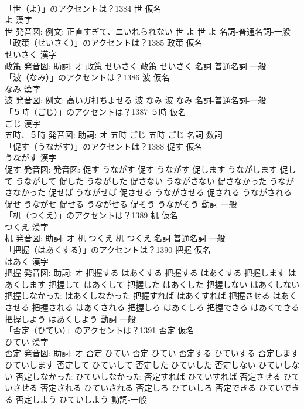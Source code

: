 \documentclass[8pt]{extreport}
\begin{document}
\begin{CJK}{UTF8}{min}
\\	「世（よ）」のアクセントは？1384	世 仮名　
\\	よ 漢字　
\\	世 発音図: 例文: 正直すぎて、ニいれられない	世 よ		世 よ				名詞-普通名詞-一般 
\\	「政策（せいさく）」のアクセントは？1385	政策 仮名　
\\	せいさく 漢字　
\\	政策 発音図: 助詞: オ	政策 せいさく		政策 せいさく				名詞-普通名詞-一般 
\\	「波（なみ）」のアクセントは？1386	波 仮名　
\\	なみ 漢字　
\\	波 発音図: 例文: 高いガ打ちよせる	波 なみ		波 なみ				名詞-普通名詞-一般 
\\	「５時（ごじ）」のアクセントは？1387	５時 仮名　
\\	ごじ 漢字　
\\	五時、５時 発音図: 助詞: オ	五時 ごじ		五時 ごじ				名詞-数詞 
\\	「促す（うながす）」のアクセントは？1388	促す 仮名　
\\	うながす 漢字　
\\	促す 発音図: 発音図:	促す うながす		促す うながす 促します うながします 促して うながして 促した うながした 促さない うながさない 促さなかった うながさなかった 促せば うながせば 促させる うながさせる 促される うながされる 促せ うながせ 促せる うながせる 促そう うながそう				動詞-一般 
\\	「机（つくえ）」のアクセントは？1389	机 仮名　
\\	つくえ 漢字　
\\	机 発音図: 助詞: オ	机 つくえ		机 つくえ				名詞-普通名詞-一般 
\\	「把握（はあくする）」のアクセントは？1390	把握 仮名　
\\	はあく 漢字　
\\	把握 発音図: 助詞: オ	把握する はあくする		把握する はあくする 把握します はあくします 把握して はあくして 把握した はあくした 把握しない はあくしない 把握しなかった はあくしなかった 把握すれば はあくすれば 把握させる はあくさせる 把握される はあくされる 把握しろ はあくしろ 把握できる はあくできる 把握しよう はあくしよう				動詞-一般 
\\	「否定（ひてい）」のアクセントは？1391	否定 仮名　
\\	ひてい 漢字　
\\	否定 発音図: 助詞: オ	否定 ひてい		否定 ひてい 否定する ひていする 否定します ひていします 否定して ひていして 否定した ひていした 否定しない ひていしない 否定しなかった ひていしなかった 否定すれば ひていすれば 否定させる ひていさせる 否定される ひていされる 否定しろ ひていしろ 否定できる ひていできる 否定しよう ひていしよう				動詞-一般 

\end{CJK}
\end{document}
